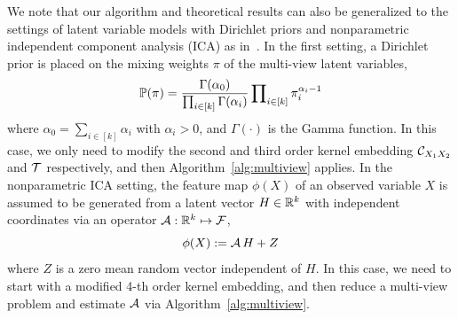 \documentclass{article}
\begin{document}
We note that our algorithm and theoretical results can also be generalized to the settings of latent variable models with Dirichlet priors and nonparametric independent component analysis (ICA) as in~\citet{AnandkumarEtal:tensor12}. In the first setting, a Dirichlet prior is placed on the mixing weights $\pi$ of the multi-view latent variables,
$$
	\mathbb{P}(\pi) = \frac{\Gamma(\alpha_0)}{\prod\nolimits_{i \in [k]} \Gamma(\alpha_i)} \prod\nolimits_{i \in [k]} \pi_i^{\alpha_i - 1}
$$
where $\alpha_0 = \sum_{i \in [k]} \alpha_i$ with $\alpha_i > 0$, and $\Gamma(\cdot)$ is the Gamma function. In this case, we only need to modify the second and third order kernel embedding $\mathcal{C}_{X_1X_2}$ and ${\mathcal{T}}$ respectively, and then Algorithm~\ref{alg:multiview} applies. In the nonparametric ICA setting, the feature map $\phi(X)$ of an observed variable $X$ is assumed to be generated from a latent vector $H \in \mathbb{R}^k$ with independent coordinates via an operator $\mathcal{A}:\mathbb{R}^k \mapsto \mathcal{F}$,
$$
	\phi(X) := \mathcal{A}\, H + Z
$$
where $Z$ is a zero mean random vector independent of $H$. In this case,
we need to start with a modified 4-th order kernel embedding, and then reduce a multi-view problem and estimate $\mathcal{A}$ via Algorithm~\ref{alg:multiview}.
\end{document}
